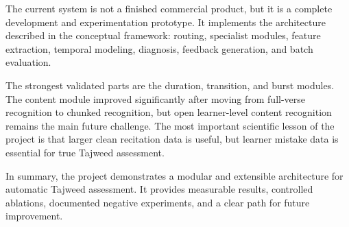 The current system is not a finished commercial product, but it is a complete
development and experimentation prototype. It implements the architecture
described in the conceptual framework: routing, specialist modules, feature
extraction, temporal modeling, diagnosis, feedback generation, and batch
evaluation.

The strongest validated parts are the duration, transition, and burst modules.
The content module improved significantly after moving from full-verse
recognition to chunked recognition, but open learner-level content recognition
remains the main future challenge. The most important scientific lesson of the
project is that larger clean recitation data is useful, but learner mistake data
is essential for true Tajweed assessment.

In summary, the project demonstrates a modular and extensible architecture for
automatic Tajweed assessment. It provides measurable results, controlled
ablations, documented negative experiments, and a clear path for future
improvement.
